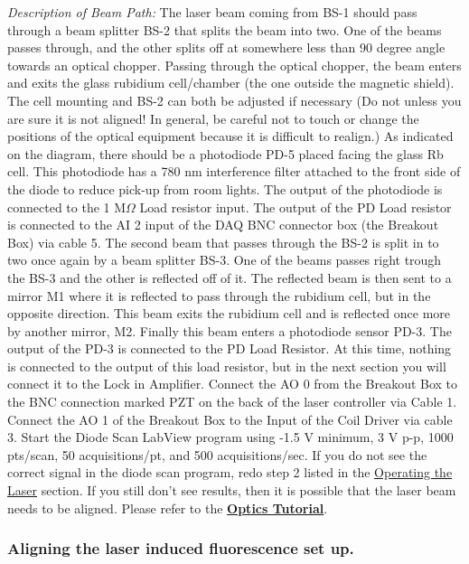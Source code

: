 \documentclass{../lab}
\begin{document}
\emph{Description of Beam Path:} The laser beam coming from BS-1 should pass through a beam splitter BS-2 that splits the beam into two. One of the beams passes through, and the other splits off at somewhere less than 90 degree angle towards an optical chopper. Passing through the optical chopper, the beam enters and exits the glass rubidium cell/chamber (the one outside the magnetic shield). The cell mounting and BS-2 can both be adjusted if necessary (Do not unless you are sure it is not aligned! In general, be careful not to touch or change the positions of the optical equipment because it is difficult to realign.) As indicated on the diagram, there should be a photodiode PD-5 placed facing the glass Rb cell. This photodiode has a 780 nm interference filter attached to the front side of the diode to reduce pick-up from room lights. The output of the photodiode is connected to the 1 M$\Omega$ Load resistor input. The output of the PD Load resistor is connected to the AI 2 input of the DAQ BNC connector box (the Breakout Box) via cable 5. The second beam that passes through the BS-2 is split in to two once again by a beam splitter BS-3. One of the beams passes right trough the BS-3 and the other is reflected off of it. The reflected beam is then sent to a mirror M1 where it is reflected to pass through the rubidium cell, but in the opposite direction. This beam exits the rubidium cell and is reflected once more by another mirror, M2. Finally this beam enters a photodiode sensor PD-3. The output of the PD-3 is connected to the PD Load Resistor. At this time, nothing is connected to the output of this load resistor, but in the next section you will connect it to the Lock in Amplifier. Connect the AO 0 from the Breakout Box to the BNC connection marked PZT on the back of the laser controller via Cable 1. Connect the AO 1 of the Breakout Box to the Input of the Coil Driver via cable 3. Start the Diode Scan LabView program using -1.5 V minimum, 3 V p-p, 1000 pts/scan, 50 acquisitions/pt, and 500 acquisitions/sec. If you do not see the correct signal in the diode scan program, redo step 2 listed in the \hyperref[subsubsec:OperatingTheLaser]{Operating the Laser} section. If you still don't see results, then it is possible that the laser beam needs to be aligned. Please refer to the \href{http://experimentationlab.berkeley.edu/OpticsTutorial}{\textbf{Optics Tutorial}}.

\newpage

\subsubsection{Aligning the laser induced fluorescence set up.}
\end{document}
